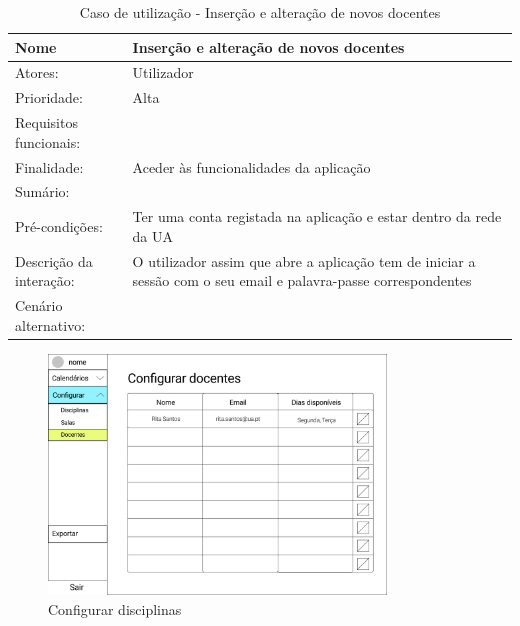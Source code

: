 \documentclass[11pt, twoside]{report}
\begin{document}
\begin{table}[H]
	\caption{Caso de utilização - Inserção e alteração de novos docentes}
	\begin{center}	
		\begin{tabularx}{\textwidth}{|l|X|}
			\hline
			\textbf{Nome }	& \textbf{Inserção e alteração de novos docentes} \\
			\hline
			Atores: & Utilizador \\
			\hline
			Prioridade: & Alta \\
			\hline
			Requisitos funcionais:&  \\
			\hline
			Finalidade: & Aceder às funcionalidades da aplicação\\
			\hline
			Sumário: &  \\
			\hline
			Pré-condições: & Ter uma conta registada na aplicação e estar dentro da rede da UA\\
			\hline
			Descrição da interação: &  O utilizador assim que abre a aplicação tem de iniciar a sessão com o seu email e palavra-passe correspondentes\\
			\hline
			Cenário alternativo:&\\
			\hline
		\end{tabularx}
	\end{center}
\end{table}
	
		\begin{figure}[H] 
		\centering 
		\includegraphics[width=0.8\textwidth,height=0.8\textheight,keepaspectratio]{image/prototipowireframes/configurardocentes}
		\caption{Configurar disciplinas}
	\end{figure}
	
\end{document}
